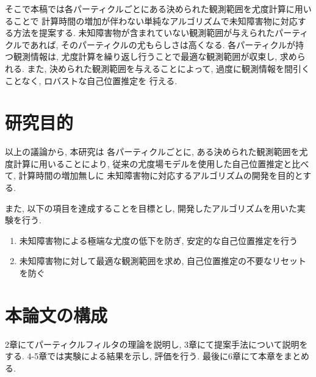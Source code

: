 そこで本稿では各パーティクルごとにある決められた観測範囲を尤度計算に用いることで
計算時間の増加が伴わない単純なアルゴリズムで未知障害物に対応する方法を提案する. 
未知障害物が含まれていない観測範囲が与えられたパーティクルであれば, 
そのパーティクルの尤もらしさは高くなる. 
各パーティクルが持つ観測情報は, 尤度計算を繰り返し行うことで最適な観測範囲が収束し, 求められる. 
また, 決められた観測範囲を与えることによって, 過度に観測情報を間引くことなく, ロバストな自己位置推定を
行える. 

\section{研究目的}
以上の議論から, 本研究は
各パーティクルごとに, ある決められた観測範囲を尤度計算に用いることにより, 
従来の尤度場モデルを使用した自己位置推定と比べて, 計算時間の増加無しに
未知障害物に対応するアルゴリズムの開発を目的とする. 

また, 以下の項目を達成することを目標とし, 開発したアルゴリズムを用いた実験を行う. 

\begin{enumerate}
  \item 未知障害物による極端な尤度の低下を防ぎ, 安定的な自己位置推定を行う
  \item 未知障害物に対して最適な観測範囲を求め, 自己位置推定の不要なリセットを防ぐ
\end{enumerate}

\section{本論文の構成}
2章にてパーティクルフィルタの理論を説明し, 3章にて提案手法について説明をする. 
4-5章では実験による結果を示し, 評価を行う. 最後に6章にて本章をまとめる. 
